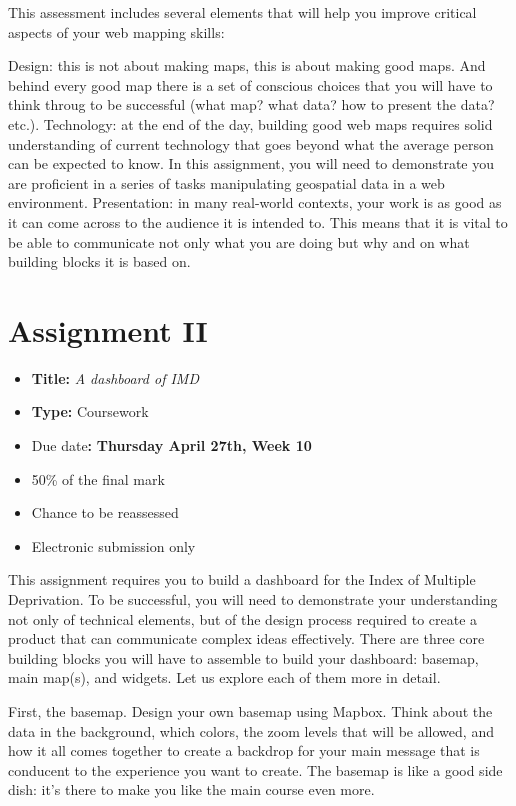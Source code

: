 \documentclass[
  letterpaper,
  DIV=11,
  numbers=noendperiod]{scrreprt}
\providecommand{\tightlist}{%
  \setlength{\itemsep}{0pt}\setlength{\parskip}{0pt}}\usepackage{longtable,booktabs,array}
\begin{document}
This assessment includes several elements that will help you improve
critical aspects of your web mapping skills:

Design: this is not about making maps, this is about making good maps.
And behind every good map there is a set of conscious choices that you
will have to think throug to be successful (what map? what data? how to
present the data? etc.). Technology: at the end of the day, building
good web maps requires solid understanding of current technology that
goes beyond what the average person can be expected to know. In this
assignment, you will need to demonstrate you are proficient in a series
of tasks manipulating geospatial data in a web environment.
Presentation: in many real-world contexts, your work is as good as it
can come across to the audience it is intended to. This means that it is
vital to be able to communicate not only what you are doing but why and
on what building blocks it is based on.

\hypertarget{assignment-ii-1}{%
\section*{Assignment II}\label{assignment-ii-1}}


\begin{itemize}
\tightlist
\item
  \textbf{Title:} \emph{A dashboard of IMD}
\item
  \textbf{Type:} Coursework
\item
  Due date\textbf{:} \textbf{Thursday April 27th, Week 10}
\item
  50\% of the final mark
\item
  Chance to be reassessed
\item
  Electronic submission only
\end{itemize}

This assignment requires you to build a dashboard for the Index of
Multiple Deprivation. To be successful, you will need to demonstrate
your understanding not only of technical elements, but of the design
process required to create a product that can communicate complex ideas
effectively. There are three core building blocks you will have to
assemble to build your dashboard: basemap, main map(s), and widgets. Let
us explore each of them more in detail.

First, the basemap. Design your own basemap using Mapbox. Think about
the data in the background, which colors, the zoom levels that will be
allowed, and how it all comes together to create a backdrop for your
main message that is conducent to the experience you want to create. The
basemap is like a good side dish: it's there to make you like the main
course even more.
\end{document}
